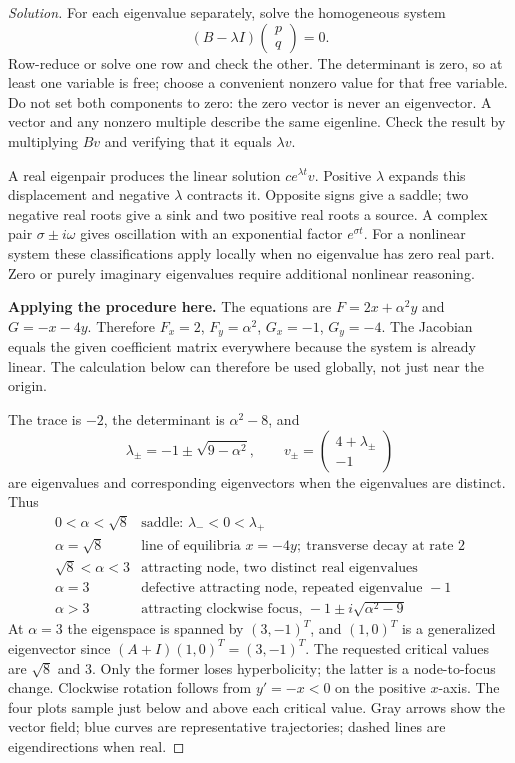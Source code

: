 \documentclass[10pt]{amsart}
\newenvironment{solution}
{\begin{proof}[Solution]}
{\end{proof}}
\begin{document}
\begin{enumerate}[label=\arabic*), leftmargin=*, itemsep=1em]
\begin{solution}
For each eigenvalue separately, solve the homogeneous system
\[
(B-\lambda I)\begin{pmatrix}p\\q\end{pmatrix}=0.
\]
Row-reduce or solve one row and check the other. The determinant is zero, so at least one variable is free; choose a convenient nonzero value for that free variable. Do not set both components to zero: the zero vector is never an eigenvector. A vector and any nonzero multiple describe the same eigenline. Check the result by multiplying $Bv$ and verifying that it equals $\lambda v$.

A real eigenpair produces the linear solution $ce^{\lambda t}v$. Positive $\lambda$ expands this displacement and negative $\lambda$ contracts it. Opposite signs give a saddle; two negative real roots give a sink and two positive real roots a source. A complex pair $\sigma\pm i\omega$ gives oscillation with an exponential factor $e^{\sigma t}$. For a nonlinear system these classifications apply locally when no eigenvalue has zero real part. Zero or purely imaginary eigenvalues require additional nonlinear reasoning.

\textbf{Applying the procedure here.} The equations are $F=2x+\alpha^2y$ and $G=-x-4y$. Therefore $F_x=2$, $F_y=\alpha^2$, $G_x=-1$, $G_y=-4$. The Jacobian equals the given coefficient matrix everywhere because the system is already linear. The calculation below can therefore be used globally, not just near the origin.


The trace is $-2$, the determinant is $\alpha^2-8$, and
\[
\lambda_\pm=-1\pm\sqrt{9-\alpha^2},\qquad
v_\pm=\begin{pmatrix}4+\lambda_\pm\\-1\end{pmatrix}
\]
are eigenvalues and corresponding eigenvectors when the eigenvalues are distinct. Thus
\[
\begin{array}{c|l}
0<\alpha<\sqrt8&\text{saddle: }\lambda_-<0<\lambda_+\\
\alpha=\sqrt8&\text{line of equilibria }x=-4y;\ \text{transverse decay at rate }2\\
\sqrt8<\alpha<3&\text{attracting node, two distinct real eigenvalues}\\
\alpha=3&\text{defective attracting node, repeated eigenvalue }-1\\
\alpha>3&\text{attracting clockwise focus, }-1\pm i\sqrt{\alpha^2-9}
\end{array}
\]
At $\alpha=3$ the eigenspace is spanned by $(3,-1)^T$, and $(1,0)^T$ is a generalized eigenvector since $(A+I)(1,0)^T=(3,-1)^T$. The requested critical values are $\sqrt8$ and $3$. Only the former loses hyperbolicity; the latter is a node-to-focus change. Clockwise rotation follows from $y'=-x<0$ on the positive $x$-axis. The four plots sample just below and above each critical value. Gray arrows show the vector field; blue curves are representative trajectories; dashed lines are eigendirections when real.


\end{solution}
\end{enumerate}
\end{document}
